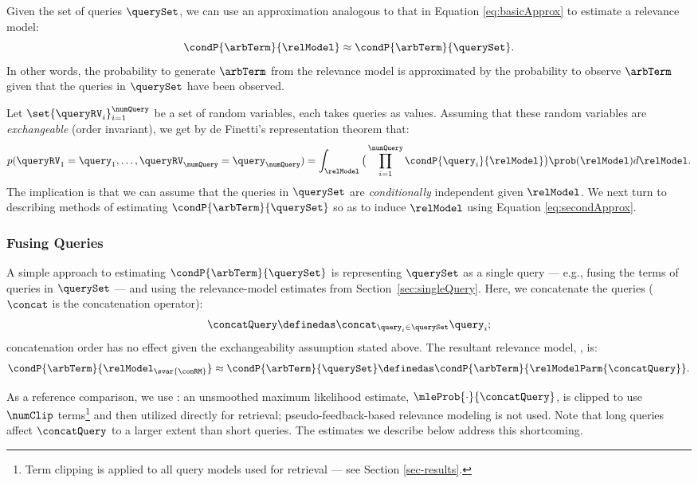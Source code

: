 Given the set of queries $\querySet$, we can use an approximation
analogous to that in Equation \ref{eq:basicApprox} to estimate a
relevance model:
\begin{equation}
\label{eq:secondApprox}
\condP{\arbTerm}{\relModel} \approx \condP{\arbTerm}{\querySet}.
\end{equation}
In other words, the probability to generate $\arbTerm$ from the
relevance model is approximated by the probability to observe
$\arbTerm$ given that the queries in $\querySet$ have been observed.

Let $\set{\queryRV_i}_{i=1}^{\numQuery}$ be a set of random
variables, each takes queries as values.
Assuming that these random variables are {\em exchangeable} (order
invariant), we get by de Finetti's representation theorem
\cite{finetti:90a} that: $$p(\queryRV_1 =
\query_1,\ldots,\queryRV_{\numQuery}=\query_{\numQuery} ) =
\int_{\relModel} \big (\prod_{i=1}^{\numQuery}  \condP{\query_i}{\relModel} \big)
\prob(\relModel) d \relModel.$$ 
The implication is that we can assume that the queries in $\querySet$
are {\em conditionally} independent given $\relModel$.
We next turn to describing methods of estimating
$\condP{\arbTerm}{\querySet}$ so as to induce $\relModel$ using
Equation \ref{eq:secondApprox}.

\subsubsection{Fusing Queries}
\label{sec:fuseQueries}
\label{sec:reduceSingle}
A simple approach to estimating $\condP{\arbTerm}{\querySet}$ is
representing $\querySet$ as a single query --- e.g., fusing the terms
of queries in $\querySet$ --- and using the relevance-model estimates
from Section~{\ref{sec:singleQuery}}.
Here, we concatenate the queries ($\concat$ is the concatenation operator):
$$\concatQuery \definedas
\concat_{\query_i \in \querySet} \query_i;$$
concatenation order has no effect given the exchangeability
assumption stated above.
The resultant relevance model, \firstmention{\conRM}, is:
\begin{equation}
\label{eq:concatRM}
\condP{\arbTerm}{\relModel_{\svar{\conRM}}} \approx \condP{\arbTerm}{\querySet} \definedas \condP{\arbTerm}{\relModelParm{\concatQuery}}.
\end{equation}

As a reference comparison, we use \firstmention{\conMLE}: an
unsmoothed maximum likelihood estimate,
$\mleProb{\cdot}{\concatQuery}$, is clipped to use $\numClip$
terms\footnote{Term clipping is applied to all query models used for
retrieval --- see Section \ref{sec-results}.}
and then utilized directly for retrieval; pseudo-feedback-based
relevance modeling is not used.
Note that long queries affect $\concatQuery$ to a larger extent than
short queries.
The estimates we describe below address this shortcoming.

